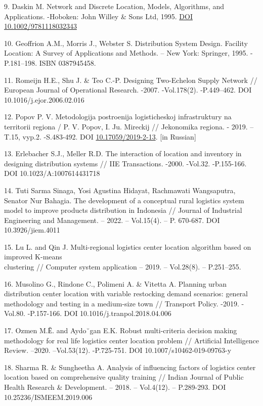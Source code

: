 \begin{references}
9. Daskin M. Network and Discrete Location, Models, Algorithms, and
Applications. -Hoboken: John Willey \& Sons Ltd, 1995.
\href{http://dx.doi.org/10.1002/9781118032343}{DOI
10.1002/9781118032343}

10. Geoffrion A.M., Morris J., Webster S. Distribution System Design.
Facility Location: A Survey of Applications and Methods. -- New York:
Springer, 1995. -P.181--198. ISBN 0387945458.

11. Romeijn H.E., Shu J. \& Teo C.-P. Designing Two-Echelon Supply
Network // European Journal of Operational Research. -2007. -Vol.178(2).
-P.449--462. DOI 10.1016/j.ejor.2006.02.016

12. Popov P. V. Metodologija postroenija logisticheskoj infrastruktury na
territorii regiona / P. V. Popov, I. Ju. Mireckij // Jekonomika regiona.
- 2019. -- T.15, vyp.2. -S.483-492. DOI \href{http://dx.doi.org/10.17059/2019-2-13}{10.17059/2019-2-13}.
{[}in Russian{]}

13. Erlebacher S.J., Meller R.D. The interaction of location and
inventory in designing distribution systems // IIE Transactions. -2000.
-Vol.32. -P.155-166. DOI 10.1023/A:1007614431718

14. Tuti Sarma Sinaga, Yosi Agustina Hidayat, Rachmawati Wangsaputra,
Senator Nur Bahagia. The development of a conceptual rural logistics
system model to improve products distribution in Indonesia // Journal of
Industrial Engineering and Management. -- 2022. -- Vol.15(4). -- P.
670-687. DOI \\10.3926/jiem.4011

15. Lu L. and Qin J. Multi-regional logistics center location algorithm
based on improved K-means \\clustering // Computer system application --
2019. -- Vol.28(8). -- P.251--255.

16. Musolino G., Rindone C., Polimeni A. \& Vitetta A. Planning urban
distribution center location with variable restocking demand scenarios:
general methodology and testing in a medium-size town // Transport
Policy. -2019. -Vol.80. -P.157-166. DOI 10.1016/j.tranpol.2018.04.006

17. Ozmen M.Ё. and Aydo˘gan E.K. Robust multi-criteria decision making
methodology for real life logistics center location problem //
Artificial Intelligence Review. --2020. --Vol.53(12). -P.725-751. DOI
10.1007/s10462-019-09763-y

18. Sharma R. \& Sungheetha A. Analysis of influencing factors of
logistics center location based on comprehensive quality training //
Indian Journal of Public Health Research \& Development. -- 2018. --
Vol.4(12). -- P.289-293. DOI 10.25236/ISMEEM.2019.006


\end{references}
